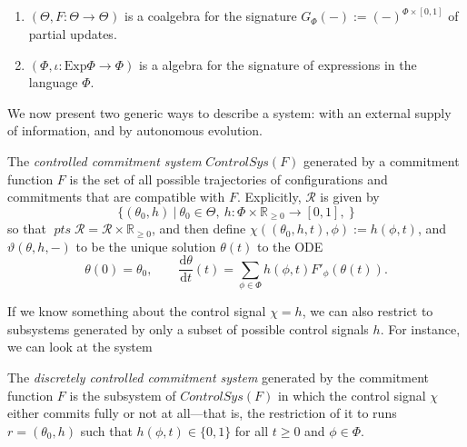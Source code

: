 \documentclass{article}
\newcommand\pts{\mathop{\mathit{pts}}}
\begin{document}
    \begin{remark}
        \begin{enumerate}
            \item 
            $(\Theta, F: \Theta \to \Theta^{})$ is a coalgebra for the signature $G_\Phi(-) := (-)^{\Phi \times [0,1]}$ of partial updates.
            \item $(\Phi, \iota : \mathrm{Exp} \Phi \to \Phi)$ is a algebra for the signature of expressions in the language $\Phi$. 
        \end{enumerate}
    \end{remark}
    
    
    We now present two generic ways to describe a system: with an external supply of information, and by autonomous evolution. 
    
    \begin{defn}
        The \emph{controlled commitment system} 
        $\mathit{ControlSys}(F)$
        generated by a commitment function $F$ is the set  of all possible trajectories of configurations and commitments that are compatible with $F$. 
        Explicitly, $\mathcal R$ is given by
        \[
            \Big\{ (\theta_0, h) ~\Big|~  \theta_0 \in \Theta,~
                h : \Phi \times \mathbb R_{\ge 0} \to [0,1],~
                 \Big\}
        \]
        so that $\pts \mathcal R = \mathcal R \times \mathbb R_{\ge 0}$,
        and then define
        $\chi((\theta_0,h,t),\phi) := h(\phi, t)$,
        and 
        $\vartheta(\theta,h,-)$ to be the unique solution $\theta(t)$ to the ODE
        \[
            \theta(0) = \theta_0,
            \qquad \frac{\mathrm d\theta}{\mathrm d t} (t) = 
                \sum_{\phi \in \Phi} h(\phi, t) F'_\phi(\theta(t)).
        \]
    \end{defn}
    
    If we know something about the control signal $\chi = h$, we can also restrict to subsystems generated by only a subset of possible 
    control signals $h$. For instance, we can look at the system 
    
    \begin{defn}
        The \emph{discretely controlled commitment system} generated by the commitment function $F$ is the subsystem of $\mathit{ControlSys}(F)$ in which the control signal $\chi$ either commits fully or not at all---that is,
        the restriction of it to runs $r = (\theta_0, h)$ such that $h(\phi, t) \in \{0,1\}$
                for all $t \ge 0$ and $\phi \in \Phi$.
    \end{defn}
\end{document}
